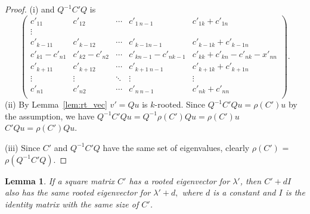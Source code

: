 \documentclass{article}
\theoremstyle{plain}
\newtheorem{lem}[thm]{Lemma}
\theoremstyle{definition}
\newtheorem{rem}[thm]{Remark}
\begin{document}
\begin{comment}


\begin{rem}
        (i) is immediate from Definition~\ref{m_rooted} and the observation that   
        $$Q^{-1}=I-E_{kn}=\begin{pmatrix}
        1 &  & & &  & 0 \\
         & 1 &  &      &  &  \\
         &  & \ddots & &  & -1 \\
         &  &        & &  &  \\
          &  & & & 1 &  \\
        0 &  & & &  & 1 \\
        \end{pmatrix},$$
\end{rem}
\end{comment}   
\begin{proof}
    (i)
    and $Q^{-1}C'Q$ is
    $$\begin{pmatrix}
    c'_{11}     & c'_{12} & \cdots     & c'_{1\ n-1} & c'_{1k}+c'_{1n} \\
    \vdots \\
    c'_{k-11}     & c'_{k-1 2}           & \cdots     & c'_{k-1 n-1} & c'_{k-1k}+c'_{k-1n} \\
    c'_{k1}-c'_{n1} & c'_{k2}-c'_{n2} &\cdots      &c'_{kn-1}-c'_{nk-1}& c'_{kk}+c'_{kn}-c'_{nk}-x'_{nn}\\
    c'_{k+11}     & c'_{k+12}           & \cdots     & c'_{k+1\ n-1} & c'_{k+1k}+c'_{k+1n} \\
    \vdots              & \vdots & \ddots              & \vdots & \vdots \\
    c'_{n1}             & c'_{n2} & \cdots             & c'_{n\ n-1} & c'_{nk}+c'_{nn} \\
    \end{pmatrix}.$$
    (ii)
        By Lemma~\ref{lem:rt_vec} $v'=Qu$ is $k$-rooted.  
        Since $Q^{-1}C'Qu=\rho(C')u$ by the assumption, we have
        $Q^{-1} C' Q u  = Q^{-1} \rho(C') Qu  =\rho(C')u$  \\
        $C'Qu=\rho(C')Qu$.

    (iii)
    Since $C'$ and $Q^{-1}C'Q$ have the same set of eigenvalues, clearly $\rho(C')$ = $\rho(Q^{-1}C'Q)$.

\end{proof}


\begin{lem}\label{l_diag}   %
If a square matrix $C'$ has a rooted eigenvector for $\lambda'$, then $C'+dI$ also has
the same rooted eigenvector for $\lambda'+d,$ where $d$ is a constant and $I$ is the identity matrix with the same size of $C'$.
\end{lem}
\end{document}

